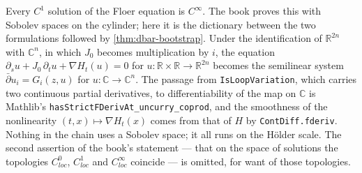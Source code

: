 \begin{proposition}
  \label{prop:6.5.3}
  \leanok
  Every $C^1$ solution of the Floer equation is $C^\infty$.  The book proves this
  with Sobolev spaces on the cylinder; here it is the dictionary between the two
  formulations followed by \ref{thm:dbar-bootstrap}.  Under the identification of
  $\mathbb{R}^{2n}$ with $\mathbb{C}^n$, in which $J_0$ becomes multiplication by
  $i$, the equation
  $\partial_s u + J_0\,\partial_t u + \nabla H_t(u) = 0$ for
  $u \colon \mathbb{R}\times\mathbb{R} \to \mathbb{R}^{2n}$ becomes the semilinear
  system $\bar\partial u_i = G_i(z, u)$ for $u \colon \mathbb{C} \to
  \mathbb{C}^n$.  The passage from \texttt{IsLoopVariation}, which carries two
  continuous partial derivatives, to differentiability of the map on
  $\mathbb{C}$ is Mathlib's
  \texttt{hasStrictFDerivAt\_uncurry\_coprod}, and the smoothness of the
  nonlinearity $(t,x)\mapsto \nabla H_t(x)$ comes from that of $H$ by
  \texttt{ContDiff.fderiv}.  Nothing in the chain uses a Sobolev space; it all
  runs on the H\"older scale.  The second assertion of the book's statement ---
  that on the space of solutions the topologies $C^0_{loc}$, $C^1_{loc}$ and
  $C^\infty_{loc}$ coincide --- is omitted, for want of those topologies.
\end{proposition}

